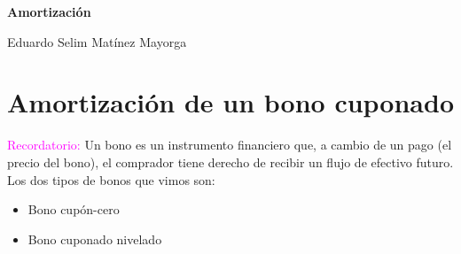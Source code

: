 





\begin{titlingpage} %

    \raggedleft %
	
	\vspace*{\baselineskip} %
	
	\vspace*{0.25\textheight} %
	
    
    \vspace*{0.1\textheight}

    {\Huge{\textbf{Amortización}}}\\[\baselineskip] %
    \vspace*{0.1\textheight}

    
    {\Large Eduardo Selim Matínez Mayorga}\\[\baselineskip]
	
	\vfill

\end{titlingpage}

\thispagestyle{empty}


\chapter*{Amortización de un bono cuponado}
\textcolor{magenta}{Recordatorio:} Un bono es un instrumento financiero que, a cambio de un pago (el precio del bono), el comprador tiene derecho de recibir un flujo de efectivo futuro.\\
Los dos tipos de bonos que vimos son:
\begin{itemize}
    \item Bono cupón-cero
    \item Bono cuponado nivelado
\end{itemize}

